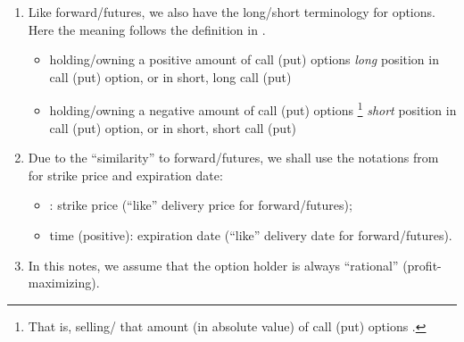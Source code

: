 \begin{enumerate}
\item Like forward/futures, we also have the long/short terminology for
options. Here the meaning follows the definition in
.
\begin{itemize}
\item holding/owning a positive amount of call (put) options 
 \emph{long} position in call (put) option, or in short,
long call (put)
\item holding/owning a negative amount of call (put) options
\footnote{That is, selling/ that amount (in
absolute value) of call (put) options .} 
\emph{short} position in call (put) option, or in short, short call (put)
\end{itemize}

\item Due to the ``similarity'' to forward/futures, we shall use the notations
from  for strike price and expiration date:
\begin{itemize}
\item {}: strike price (``like'' delivery price for forward/futures);
\item time  (positive): expiration date (``like'' delivery date for
forward/futures).
\end{itemize}

\item In this notes, we assume that the option holder is always ``rational''
(profit-maximizing).
\end{enumerate}
